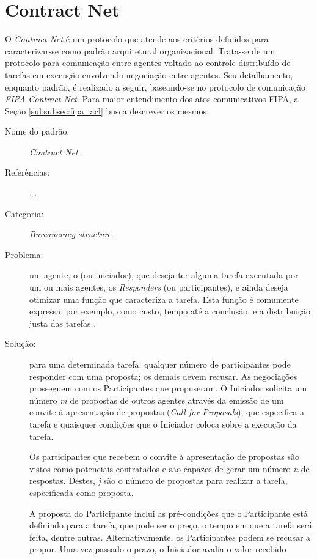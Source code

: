 \chapter{Contract Net}\label{ch:contract_net}

O \textit{Contract Net} é um protocolo que atende aos critérios definidos para caracterizar-se como padrão arquitetural organizacional. Trata-se de um protocolo para comunicação entre agentes voltado ao controle distribuído de tarefas em execução envolvendo negociação entre agentes. Seu detalhamento, enquanto padrão, é realizado a seguir, baseando-se no protocolo de comunicação \textit{FIPA-Contract-Net}. Para maior entendimento dos atos comunicativos FIPA, a Seção \ref{subsubsec:fipa_acl} busca descrever os mesmos.



\begin{description}
  \item[Nome do padrão:] \textit{Contract Net}.
    \item[Referências:]    , .
    \item[Categoria:] \textit{Bureaucracy structure}.
    \item[Problema:] um agente, o \initiator (ou iniciador), que deseja ter alguma tarefa executada por um ou mais agentes, os \textit{Responders} (ou participantes), e ainda deseja otimizar uma função que caracteriza a tarefa. Esta função é comumente expressa, por exemplo, como custo, tempo até a conclusão, e a distribuição justa das tarefas \cite{developing}.
    \item[Solução:] para uma determinada tarefa, qualquer número de participantes pode responder com uma proposta; os demais devem recusar. As negociações prosseguem com os Participantes que propuseram.
O Iniciador solicita um número \textit{m} de propostas de outros agentes através da emissão de um convite à apresentação de propostas (\textit{Call for Proposals}), que especifica a tarefa e quaisquer condições que o Iniciador coloca sobre a execução da tarefa. 

Os participantes que recebem o convite à apresentação de propostas são vistos como potenciais contratados e são capazes de gerar um número \textit{n} de respostas. Destes, \textit{j} são o número de propostas para realizar a tarefa, especificada como proposta.

A proposta do Participante inclui as pré-condições que o Participante está definindo para a tarefa, que pode ser o preço, o tempo em que a tarefa será feita, dentre outras. Alternativamente, os Participantes podem se recusar a propor. Uma vez passado o prazo, o Iniciador avalia o valor recebido



\end{description}
